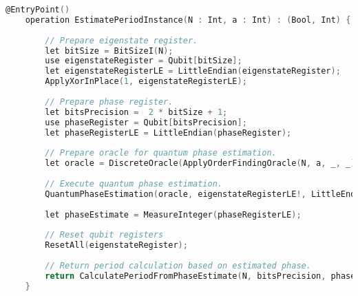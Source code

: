 \begin{lstlisting}[language=C]
    @EntryPoint()
    operation EstimatePeriodInstance(N : Int, a : Int) : (Bool, Int) {
    
        // Prepare eigenstate register.
        let bitSize = BitSizeI(N);
        use eigenstateRegister = Qubit[bitSize];
        let eigenstateRegisterLE = LittleEndian(eigenstateRegister);
        ApplyXorInPlace(1, eigenstateRegisterLE);
    
        // Prepare phase register.
        let bitsPrecision =  2 * bitSize + 1;
        use phaseRegister = Qubit[bitsPrecision];
        let phaseRegisterLE = LittleEndian(phaseRegister);
    
        // Prepare oracle for quantum phase estimation.
        let oracle = DiscreteOracle(ApplyOrderFindingOracle(N, a, _, _));
    
        // Execute quantum phase estimation.
        QuantumPhaseEstimation(oracle, eigenstateRegisterLE!, LittleEndianAsBigEndian(phaseRegisterLE));
    
        let phaseEstimate = MeasureInteger(phaseRegisterLE);
    
        // Reset qubit registers 
        ResetAll(eigenstateRegister);
    
        // Return period calculation based on estimated phase.
        return CalculatePeriodFromPhaseEstimate(N, bitsPrecision, phaseEstimate);
    }
\end{lstlisting}
